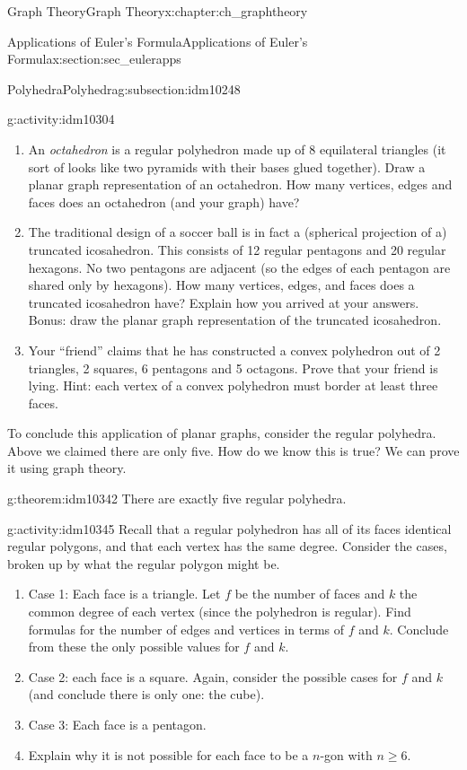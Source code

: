 \documentclass[oneside,10pt,]{book}
\numberwithin{equation}{chapter}
\begin{document}
\begin{chapterptx}{Graph Theory}{}{Graph Theory}{}{}{x:chapter:ch_graphtheory}
\begin{sectionptx}{Applications of Euler's Formula}{}{Applications of Euler's Formula}{}{}{x:section:sec_eulerapps}
\begin{subsectionptx}{Polyhedra}{}{Polyhedra}{}{}{g:subsection:idm10248}
\begin{activity}{}{g:activity:idm10304}
\begin{enumerate}[font=\bfseries,label=(\alph*),ref=\alph*]
\item{}An \emph{octahedron} is a regular polyhedron made up of 8 equilateral triangles (it sort of looks like two pyramids with their bases glued together). Draw a planar graph representation of an octahedron. How many vertices, edges and faces does an octahedron (and your graph) have?%
\item{}The traditional design of a soccer ball is in fact a (spherical projection of a) truncated icosahedron. This consists of 12 regular pentagons and 20 regular hexagons. No two pentagons are adjacent (so the edges of each pentagon are shared only by hexagons). How many vertices, edges, and faces does a truncated icosahedron have? Explain how you arrived at your answers. Bonus: draw the planar graph representation of the truncated icosahedron.%
\item{}Your ``friend'' claims that he has constructed a convex polyhedron out of 2 triangles, 2 squares, 6 pentagons and 5 octagons. Prove that your friend is lying. Hint: each vertex of a convex polyhedron must border at least three faces.%
\end{enumerate}
\end{activity}
To conclude this application of planar graphs, consider the regular polyhedra. Above we claimed there are only five. How do we know this is true? We can prove it using graph theory.%
\begin{theorem}{}{}{g:theorem:idm10342}%
There are exactly five regular polyhedra.%
\end{theorem}
\begin{activity}{}{g:activity:idm10345}%
Recall that a regular polyhedron has all of its faces identical regular polygons, and that each vertex has the same degree. Consider the cases, broken up by what the regular polygon might be.%
\begin{enumerate}[font=\bfseries,label=(\alph*),ref=\alph*]
\item{}Case 1: Each face is a triangle.  Let \(f\) be the number of faces and \(k\) the common degree of each vertex (since the polyhedron is regular).  Find formulas for the number of edges and vertices in terms of \(f\) and \(k\).  Conclude from these the only possible values for \(f\) and \(k\).%
\item{}Case 2: each face is a square.  Again, consider the possible cases for \(f\) and \(k\) (and conclude there is only one: the cube).%
\item{}Case 3: Each face is a pentagon.%
\item{}Explain why it is not possible for each face to be a \(n\)-gon with \(n \ge 6\).%

\end{enumerate}
\end{activity}
\end{subsectionptx}
\end{sectionptx}
\end{chapterptx}
\end{document}
